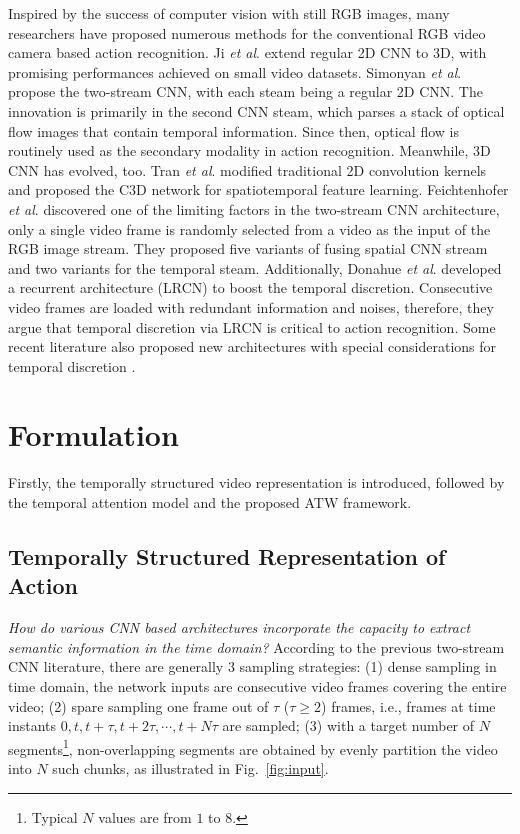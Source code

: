 \documentclass[runningheads,a4paper]{llncs}
\begin{document}
Inspired by the success of computer vision with still RGB images, many researchers have proposed numerous methods for the
conventional RGB video camera based action recognition. Ji \textit{et al}. \cite{ji20133d} extend regular 2D CNN to 3D, with
promising performances achieved on small video datasets. Simonyan \textit{et al}. \cite{simonyan2014two} propose the two-stream
CNN, with each steam being a regular 2D CNN. The innovation is primarily in the second CNN steam, which parses a stack of optical
flow images that contain temporal information. Since then, optical flow is routinely used as the secondary modality in action
recognition. Meanwhile, 3D CNN has evolved, too. Tran \textit{et al}. \cite{tran2015learning} modified traditional 2D convolution
kernels and proposed the C3D network for spatiotemporal feature learning. Feichtenhofer \textit{et al}.
\cite{feichtenhofer2016convolutional} discovered one of the limiting factors in the two-stream CNN architecture, only a
single video frame is randomly selected from a video as the input of the RGB image stream. They proposed five variants of fusing
spatial CNN stream and two variants for the temporal steam. Additionally, Donahue \textit{et al}. \cite{donahue2015long}
developed a recurrent architecture (LRCN) to boost the temporal discretion. Consecutive video frames are loaded with redundant
information and noises, therefore, they argue that temporal discretion via LRCN is critical to action recognition. Some recent
literature also proposed new architectures with special considerations for temporal discretion
\cite{wang2016temporal,yao2015describing,gaidon2013temporal,huang2018video}.
\section{Formulation}%
Firstly, the temporally structured video representation is introduced, followed by the temporal attention model and the proposed ATW framework.
\subsection{Temporally Structured Representation of Action}\label{sample}
{\em How do various CNN based architectures incorporate the capacity to extract semantic information in the time domain?} According to the previous two-stream CNN \cite{simonyan2014two} literature, there are generally $3$ sampling strategies: (1) dense sampling in time domain, the network inputs are consecutive video frames covering the entire video; (2) spare sampling one frame out of $\tau$ ($\tau \geq 2$) frames, i.e., frames at time instants $0,t,t+\tau,t+2\tau,\cdots,t+N\tau$ are sampled; (3) with a target number of $N$ segments\footnote{Typical $N$ values are from $1$ to $8$.}, non-overlapping segments are obtained by evenly partition the video into $N$ such chunks, as illustrated in Fig.~\ref{fig:input}.
\end{document}
